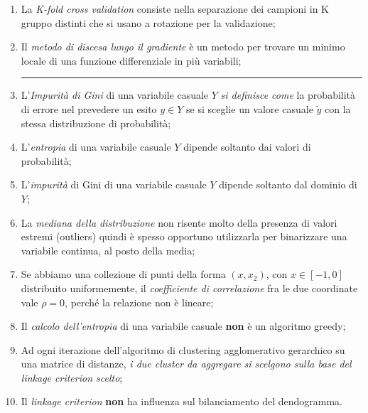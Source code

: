 \begin{enumerate}
	\item La \emph{K-fold cross validation} consiste nella separazione dei campioni in K gruppo distinti che si usano a rotazione per la validazione;

	\item Il \emph{metodo di discesa lungo il gradiente} è un metodo per trovare un minimo locale di una funzione differenziale in più variabili;

\rule{\linewidth}{0.4pt}

	\item L'\emph{Impurità di Gini} di una variabile casuale \( Y \) \emph{si definisce come} la probabilità di errore nel prevedere un esito \( y \in Y \) se si sceglie un valore casuale \( \tilde{y} \) con la stessa distribuzione di probabilità;

	\item L’\emph{entropia} di una variabile casuale \( Y \) dipende soltanto dai valori di probabilità;

	\item L’\emph{impurità} di Gini di una variabile casuale \( Y \) dipende soltanto dal dominio di \( Y \);

	\item La \emph{mediana della distribuzione} non risente molto della presenza di valori estremi (outliers) quindi è spesso opportuno utilizzarla per binarizzare una variabile continua, al posto della media;

	\item Se abbiamo una collezione di punti della forma \( (x, x_{2} ) \), con \( x \in [−1, 0] \) distribuito uniformemente, il \emph{coefficiente di correlazione} fra le due coordinate vale \( \rho = 0 \), perché la relazione non è lineare;

	\item Il \emph{calcolo dell’entropia} di una variabile casuale \textbf{non} è un algoritmo greedy;

	\item Ad ogni iterazione dell’algoritmo di clustering agglomerativo gerarchico su una matrice di distanze, \emph{i due cluster da aggregare si scelgono sulla base del linkage criterion scelto};

	\item Il \emph{linkage criterion} \textbf{non} ha influenza sul bilanciamento del dendogramma.

\end{enumerate}
